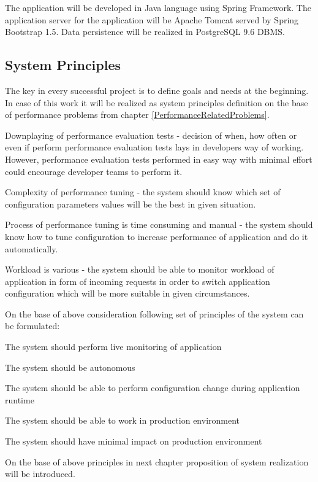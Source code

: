 \documentclass[10pt,a4paper]{article}
\let\tempone\itemize
\let\temptwo\enditemize
\renewenvironment{itemize}{\tempone\addtolength{\itemsep}{-0.4\baselineskip}}{\temptwo}
\let\tempone\enumerate
\let\temptwo\endenumerate
\begin{document}
The application will be developed in Java language using Spring Framework. The application server for the application will be Apache Tomcat served by Spring Bootstrap 1.5. Data persistence will be realized in PostgreSQL 9.6 DBMS.  

\subsection{System Principles}
The key in every successful project is to define goals and needs at the beginning.
In case of this work it will be realized as system principles definition on the base of  performance problems from chapter \ref{PerformanceRelatedProblems}.

Downplaying of performance evaluation tests - decision of when, how often or even if perform performance evaluation tests lays in developers way of working. However, performance evaluation tests performed in easy way with minimal effort could encourage developer teams to perform it. 

Complexity of performance tuning - the system should know which set of configuration parameters values will be the best in given situation.  

Process of performance tuning is time consuming and manual - the system should know how to tune configuration to increase performance of application and do it automatically. 

Workload is various - the system should be able to monitor workload of application in form of incoming requests in order to switch application configuration which will be more suitable in given circumstances. 

On the base of above consideration following set of principles of the system can be formulated:

\begin{itemize}
\item The system should perform live monitoring of application
\item The system should be autonomous
\item The system should be able to perform configuration change during application runtime
\item The system should be able to work in production environment
\item The system should have minimal impact on production environment
\end{itemize}

On the base of above principles in next chapter proposition of system realization will be introduced.  
\end{document}
